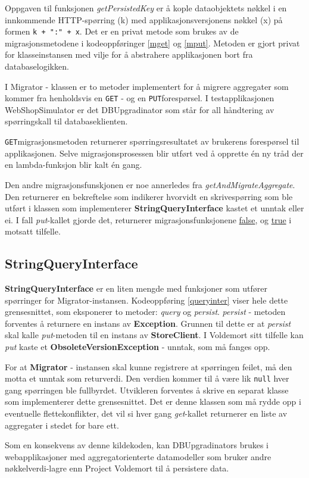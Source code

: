 

Oppgaven til funksjonen \emph{getPersistedKey} er å kople dataobjektets nøkkel i en innkommende HTTP-spørring (k) med applikasjonsversjonens nøkkel (x) på formen \texttt{k + ":" + x}. Det er en privat metode som brukes av de migrasjonsmetodene i kodeoppføringer \ref{mget} og \ref{mput}. Metoden er gjort privat for klasseinstansen med vilje for å abstrahere applikasjonen bort fra databaselogikken.

I Migrator - klassen er to metoder implementert for å migrere aggregater som kommer fra henholdsvis en \texttt{GET} - og en \texttt{PUT}\-forespørsel. I testapplikasjonen WebShopSimulator er det DBUpgradinator som står for all håndtering av spørringskall til databaseklienten.



\texttt{GET}\-migrasjonsmetoden returnerer spørringsresultatet av brukerens forespørsel til applikasjonen. Selve migrasjonsprosessen blir utført ved å opprette én ny tråd der en lambda-funksjon blir kalt én gang.



Den andre migrasjonsfunskjonen er noe annerledes fra \emph{getAndMigrateAggregate}. Den returnerer en bekreftelse som indikerer hvorvidt en skrivespørring som ble utført i klassen som implementerer \textbf{StringQueryInterface} kastet et unntak eller ei. I fall \emph{put}-kallet gjorde det, returnerer migrasjonsfunksjonene \underline{false}, og \underline{true} i motsatt tilfelle.

\subsection{StringQueryInterface} \label{chaptersqi}



\textbf{StringQueryInterface} er en liten mengde med funksjoner som utfører spørringer for Migrator-instansen. Kodeoppføring \ref{queryinter} viser hele dette grensesnittet, som eksponerer to metoder: \emph{query} og \emph{persist}. \emph{persist} - metoden forventes å returnere en instans av \textbf{Exception}. Grunnen til dette er at \emph{persist} skal kalle \emph{put}-metoden til en instans av \textbf{StoreClient}. I Voldemort sitt tilfelle kan \emph{put} kaste et \textbf{ObsoleteVersionException} - unntak, som må fanges opp. 

For at \textbf{Migrator} - instansen skal kunne registrere at spørringen feilet, må den motta et unntak som retur\-verdi. Den verdien kommer til å være lik \texttt{null} hver gang spørringen ble fullbyrdet. Utvikleren forventes å skrive en separat klasse som implementerer dette grensesnittet. Det er denne klassen som må rydde opp i eventuelle flettekonflikter, det vil si hver gang \emph{get}-kallet returnerer en liste av aggregater i stedet for bare ett.

Som en konsekvens av denne kildekoden, kan DBUpgradinators brukes i webapplikasjoner med aggregatorienterte datamodeller som bruker andre nøkkelverdi-lagre enn Project Voldemort til å persistere data.

